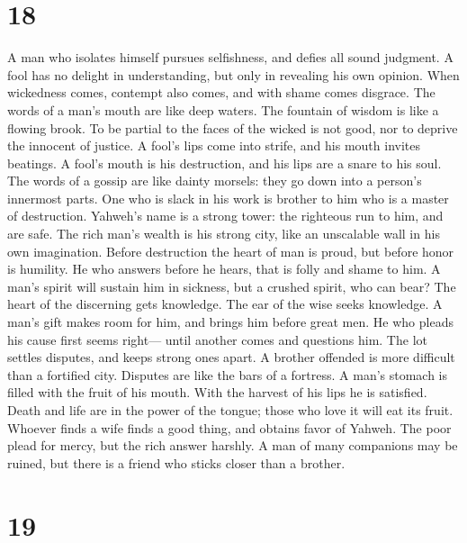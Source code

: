 \hypertarget{section-17}{%
\section{18}\label{section-17}}

 A man who isolates himself pursues selfishness, and defies
all sound judgment.  A fool has no delight in understanding,
but only in revealing his own opinion.  When wickedness
comes, contempt also comes, and with shame comes disgrace. 
The words of a man's mouth are like deep waters. The fountain of wisdom
is like a flowing brook.  To be partial to the faces of the
wicked is not good, nor to deprive the innocent of justice. 
A fool's lips come into strife, and his mouth invites beatings.
 A fool's mouth is his destruction, and his lips are a snare
to his soul.  The words of a gossip are like dainty morsels:
they go down into a person's innermost parts.  One who is
slack in his work is brother to him who is a master of destruction.
 Yahweh's name is a strong tower: the righteous run to him,
and are safe.  The rich man's wealth is his strong city,
like an unscalable wall in his own imagination.  Before
destruction the heart of man is proud, but before honor is humility.
 He who answers before he hears, that is folly and shame to
him.  A man's spirit will sustain him in sickness, but a
crushed spirit, who can bear?  The heart of the discerning
gets knowledge. The ear of the wise seeks knowledge.  A
man's gift makes room for him, and brings him before great men.
 He who pleads his cause first seems right--- until another
comes and questions him.  The lot settles disputes, and
keeps strong ones apart.  A brother offended is more
difficult than a fortified city. Disputes are like the bars of a
fortress.  A man's stomach is filled with the fruit of his
mouth. With the harvest of his lips he is satisfied.  Death
and life are in the power of the tongue; those who love it will eat its
fruit.  Whoever finds a wife finds a good thing, and
obtains favor of Yahweh.  The poor plead for mercy, but the
rich answer harshly.  A man of many companions may be
ruined, but there is a friend who sticks closer than a brother.

\hypertarget{section-18}{%
\section{19}\label{section-18}}

